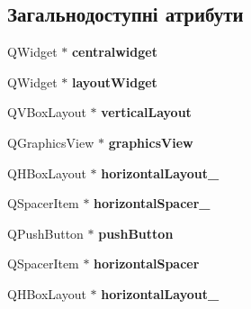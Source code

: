 \subsection*{Загальнодоступні атрибути}
\begin{DoxyCompactItemize}
\item 
\hypertarget{classUi__ExUserScreen_a2a99013ef3fceba6fc51ae3cc2d7b2e1}{Q\-Widget $\ast$ {\bfseries centralwidget}}\label{classUi__ExUserScreen_a2a99013ef3fceba6fc51ae3cc2d7b2e1}

\item 
\hypertarget{classUi__ExUserScreen_a898af8b981323f54c0ecd7e5bedb2f4b}{Q\-Widget $\ast$ {\bfseries layout\-Widget}}\label{classUi__ExUserScreen_a898af8b981323f54c0ecd7e5bedb2f4b}

\item 
\hypertarget{classUi__ExUserScreen_a7acd541ca534e13a6926a4f29e643d76}{Q\-V\-Box\-Layout $\ast$ {\bfseries vertical\-Layout}}\label{classUi__ExUserScreen_a7acd541ca534e13a6926a4f29e643d76}

\item 
\hypertarget{classUi__ExUserScreen_aa37b97327956d99f6a3bddb595c9af45}{Q\-Graphics\-View $\ast$ {\bfseries graphics\-View}}\label{classUi__ExUserScreen_aa37b97327956d99f6a3bddb595c9af45}

\item 
\hypertarget{classUi__ExUserScreen_ab3f8745ecef533e45add685a3a0e43d5}{Q\-H\-Box\-Layout $\ast$ {\bfseries horizontal\-Layout\-\_}}\label{classUi__ExUserScreen_ab3f8745ecef533e45add685a3a0e43d5}

\item 
\hypertarget{classUi__ExUserScreen_ae94f4b8796e08e30ccd807e67009f63d}{Q\-Spacer\-Item $\ast$ {\bfseries horizontal\-Spacer\-\_}}\label{classUi__ExUserScreen_ae94f4b8796e08e30ccd807e67009f63d}

\item 
\hypertarget{classUi__ExUserScreen_afba2a4123fe138f23304a56a1b0befff}{Q\-Push\-Button $\ast$ {\bfseries push\-Button}}\label{classUi__ExUserScreen_afba2a4123fe138f23304a56a1b0befff}

\item 
\hypertarget{classUi__ExUserScreen_afa1e70d1828cd20eac01382328721f6f}{Q\-Spacer\-Item $\ast$ {\bfseries horizontal\-Spacer}}\label{classUi__ExUserScreen_afa1e70d1828cd20eac01382328721f6f}

\item 
\hypertarget{classUi__ExUserScreen_a903a62e821583de883b0b1192b7be15f}{Q\-H\-Box\-Layout $\ast$ {\bfseries horizontal\-Layout\-\_}}\label{classUi__ExUserScreen_a903a62e821583de883b0b1192b7be15f}


\end{DoxyCompactItemize}
